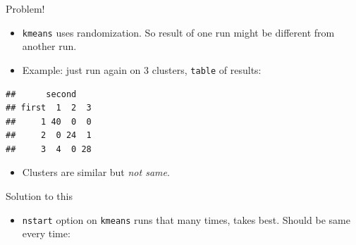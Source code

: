 \documentclass[
  ignorenonframetext,
]{beamer}
\newenvironment{Shaded}{\begin{snugshade}}{\end{snugshade}}
\newcommand{\DataTypeTok}[1]{\textcolor[rgb]{0.13,0.29,0.53}{#1}}
\newcommand{\DecValTok}[1]{\textcolor[rgb]{0.00,0.00,0.81}{#1}}
\newcommand{\KeywordTok}[1]{\textcolor[rgb]{0.13,0.29,0.53}{\textbf{#1}}}
\newcommand{\NormalTok}[1]{#1}
\newcommand{\OperatorTok}[1]{\textcolor[rgb]{0.81,0.36,0.00}{\textbf{#1}}}
\newcommand{\StringTok}[1]{\textcolor[rgb]{0.31,0.60,0.02}{#1}}
\providecommand{\tightlist}{%
  \setlength{\itemsep}{0pt}\setlength{\parskip}{0pt}}
\begin{document}
\begin{frame}[fragile]{Problem!}
\protect\hypertarget{problem}{}

\begin{itemize}
\item
  \texttt{kmeans} uses randomization. So result of one run might be
  different from another run.
\item
  Example: just run again on 3 clusters, \texttt{table} of results:
\end{itemize}

\small

\begin{Shaded}
\end{Shaded}

\begin{verbatim}
##      second
## first  1  2  3
##     1 40  0  0
##     2  0 24  1
##     3  4  0 28
\end{verbatim}

\normalsize

\begin{itemize}
\tightlist
\item
  Clusters are similar but \emph{not same}.
\end{itemize}

\end{frame}

\begin{frame}[fragile]{Solution to this}
\protect\hypertarget{solution-to-this}{}

\begin{itemize}
\tightlist
\item
  \texttt{nstart} option on \texttt{kmeans} runs that many times, takes
  best. Should be same every time:
\end{itemize}

\small

\begin{Shaded}
\end{Shaded}

\normalsize

\end{frame}
\end{document}
